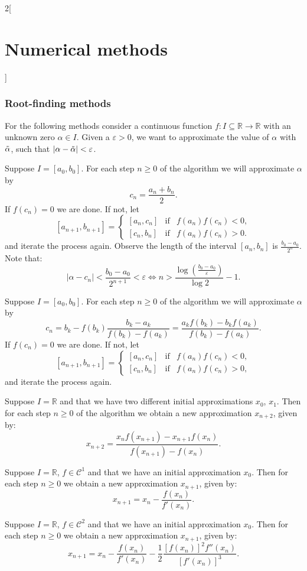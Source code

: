 \documentclass[class=article,10pt,crop=false]{standalone}
\begin{document}
\begin{multicols}{2}[\section{Numerical methods}]
\subsubsection*{Root-finding methods}
For the following methods consider a continuous function $f:I\subseteq\mathbb{R}\rightarrow\mathbb{R}$ with an unknown zero $\alpha\in I$. Given a $\varepsilon>0$, we want to approximate the value of $\alpha$ with $\Tilde{\alpha}$, such that $|\alpha-\Tilde{\alpha}|<\varepsilon$.
\begin{theorem}
Suppose $I=[a_0,b_0]$. For each step $n\geq 0$ of the algorithm we will approximate $\alpha$ by $$c_n=\frac{a_n+b_n}{2}.$$ If $f(c_n)=0$ we are done. If not, let
$$[a_{n+1},b_{n+1}]=\left\{\begin{array}{ccc}
    [a_n,c_n] & \text{if} & f(a_n)f(c_n)<0, \\
    \left[c_n,b_n\right] & \text{if} & f(a_n)f(c_n)>0.
\end{array}\right.$$ and iterate the process again. Observe the length of the interval $[a_n,b_n]$ is $\frac{b_0-a_0}{2^n}$. Note that: $$|\alpha-c_n|<\frac{b_0-a_0}{2^{n+1}}<\varepsilon\iff n>\frac{\log\left(\frac{b_0-a_0}{\varepsilon}\right)}{\log 2}-1.$$
\end{theorem}
\begin{theorem}
Suppose $I=[a_0,b_0]$. For each step $n\geq 0$ of the algorithm we will approximate $\alpha$ by $$c_n=b_k-f(b_k)\frac{b_k-a_k}{f(b_k)-f(a_k)}=\frac{a_kf(b_k)-b_kf(a_k)}{f(b_k)-f(a_k)}.$$ If $f(c_n)=0$ we are done. If not, let
$$[a_{n+1},b_{n+1}]=\left\{\begin{array}{ccc}
    [a_n,c_n] & \text{if} & f(a_n)f(c_n)<0, \\
    \left[c_n,b_n\right] & \text{if} & f(a_n)f(c_n)>0,
\end{array}\right.$$ and iterate the process again.
\end{theorem}
\begin{theorem}
Suppose $I=\mathbb{R}$ and that we have two different initial approximations $x_0$, $x_1$. Then for each step $n\geq 0$ of the algorithm we obtain a new approximation $x_{n+2}$, given by: $$x_{n+2}=\frac{x_nf(x_{n+1})-x_{n+1}f(x_n)}{f(x_{n+1})-f(x_n)}.$$
\end{theorem}
\begin{theorem}
Suppose $I=\mathbb{R}$, $f\in\mathcal{C}^1$ and that we have an initial approximation $x_0$. Then for each step $n\geq 0$ we obtain a new approximation $x_{n+1}$, given by: $$x_{n+1}=x_n-\frac{f(x_n)}{f'(x_n)}.$$
\end{theorem}
\begin{theorem}
Suppose $I=\mathbb{R}$, $f\in\mathcal{C}^2$ and that we have an initial approximation $x_0$. Then for each step $n\geq 0$ we obtain a new approximation $x_{n+1}$, given by: $$x_{n+1}=x_n-\frac{f(x_n)}{f'(x_n)}-\frac{1}{2}\frac{\left[f(x_n)\right]^2f''(x_n)}{\left[f'(x_n)\right]^3}.$$
\end{theorem}

\end{multicols}
\end{document}
